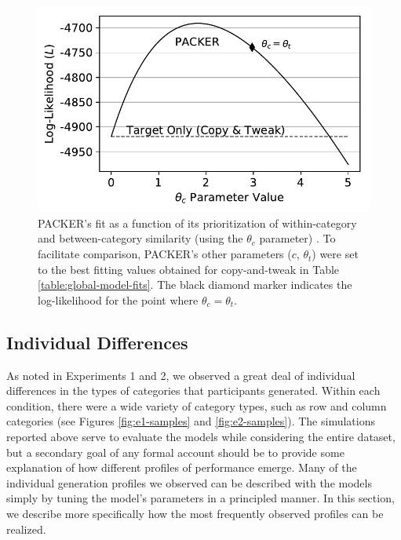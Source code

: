 \documentclass[12pt]{article}
\begin{document}
\begin{flushleft}
\begin{figure}
    \begin{center}
      \includegraphics[width=\textwidth]{figs/packer-loglike.pdf}    
      \caption{PACKER's fit as a function of its prioritization of
        within-category and between-category similarity (using the $\theta_c$
        parameter) . To facilitate comparison, PACKER's other parameters ($c$,
        $\theta_t$) were set to the best fitting values obtained for
        copy-and-tweak in Table \ref{table:global-model-fits}. The black diamond
        marker indicates the log-likelihood for the point where
        $\theta_c=\theta_t$. }
    \label{fig:packer-loglike}
    \end{center}
\end{figure}


\subsection{Individual Differences}
\label{section:individual-diffs}

As noted in Experiments 1 and 2, we observed a great deal of individual
differences in the types of categories that participants generated. Within each
condition, there were a wide variety of category types, such as row and column
categories (see Figures \ref{fig:e1-samples} and \ref{fig:e2-samples}). The
simulations reported above serve to evaluate the models while considering the
entire dataset, but a secondary goal of any formal account should be to provide
some explanation of how different profiles of performance emerge. Many of the
individual generation profiles we observed can be described with the models
simply by tuning the model's parameters in a principled manner. In this section,
we describe more specifically how the most frequently observed profiles can be
realized.


\end{flushleft}
\end{document}

